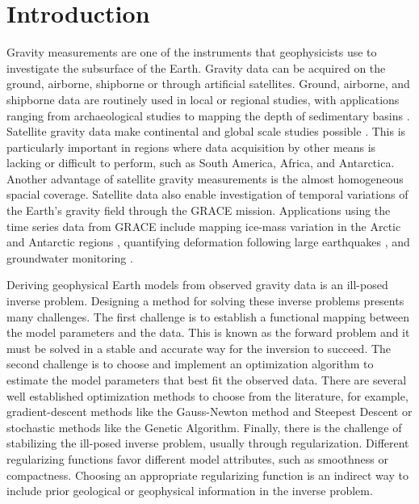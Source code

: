 \chapter{Introduction}


Gravity measurements are one of the instruments that geophysicists use to
investigate the subsurface of the Earth.
Gravity data can be acquired on the ground, airborne, shipborne or through
artificial satellites.
Ground, airborne, and shipborne data are routinely used in local or regional
studies, with applications ranging from archaeological studies
\citep[e.g., ][]{panisova2013} to mapping the depth of
sedimentary basins \citep[e.g., ][]{gordon2013}.
Satellite gravity data make continental and global scale studies possible
\citep[e.g., ][]{vandermeijde2013, vandermeijde2015, bouman2013,
braitenberg2015, reguzzoni2013}.
This is particularly important in regions where data acquisition by other means
is lacking or difficult to perform, such as South America, Africa, and
Antarctica.
Another advantage of satellite gravity measurements is the almost homogeneous
spacial coverage.
Satellite data also enable investigation of temporal variations of the Earth's
gravity field through the GRACE mission.
Applications using the time series data from GRACE include mapping ice-mass
variation in the Arctic \citep{chen2011} and Antarctic regions
\citep{ramillien2006}, quantifying deformation following large earthquakes
\citep{mikhailov2014}, and groundwater monitoring \citep{humphrey2016}.

Deriving geophysical Earth models from observed gravity data is an ill-posed
inverse problem.
Designing a method for solving these inverse problems presents many challenges.
The first challenge is to establish a functional mapping between the model
parameters and the data.
This is known as the forward problem and it must be solved in a stable and
accurate way for the inversion to succeed.
The second challenge is to choose and implement an optimization algorithm to
estimate the model parameters that best fit the observed data.
There are several well established optimization methods to choose from the
literature, for example, gradient-descent methods like the Gauss-Newton method
and Steepest Descent or stochastic  methods like the Genetic Algorithm.
Finally, there is the challenge of stabilizing the ill-posed inverse problem,
usually through regularization.
Different regularizing functions favor different model attributes, such as
smoothness or compactness.
Choosing an appropriate regularizing function is an indirect way to include
prior geological or geophysical information in the inverse problem.

